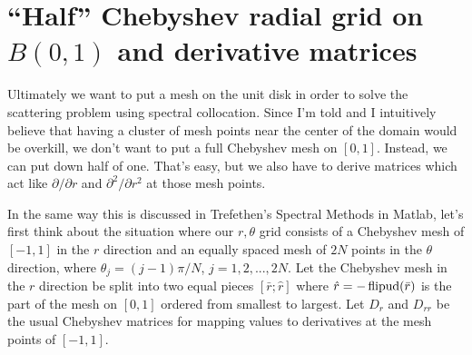 \section{``Half'' Chebyshev radial grid on $B(0,1)$ and derivative matrices}
\label{sec-halfcheb}

Ultimately we want to put a mesh on the unit disk in order
to solve the scattering problem using spectral collocation.
Since I'm told and I intuitively believe that having a cluster
of mesh points near the center of the domain would be overkill,
we don't want to put a full Chebyshev mesh on $[0,1]$. Instead,
we can put down half of one. That's easy, but we also have to
derive matrices which act like $\partial/\partial r$ and
$\partial^2/\partial r^2$ at those mesh points.

In the same way this is discussed in Trefethen's Spectral Methods
in Matlab, let's first think about the situation where
our $r,\theta$ grid consists
of a Chebyshev mesh of $[-1,1]$ in the $r$ direction and an equally
spaced mesh of $2N$ points in the $\theta$ direction, where
$\theta_j = (j-1)\pi/N$, $j = 1, 2, ..., 2N$. 
Let the Chebyshev mesh in the $r$ direction
be split into two equal pieces $[\bar{r}; \hat{r}]$ where
$\hat{r} = -\operatorname{flipud}(\bar{r})$ is the part of the mesh on $[0,1]$
ordered from smallest to largest. Let $D_r$ and $D_{rr}$ be the
usual Chebyshev matrices for mapping values to derivatives at
the mesh points of $[-1,1]$.


